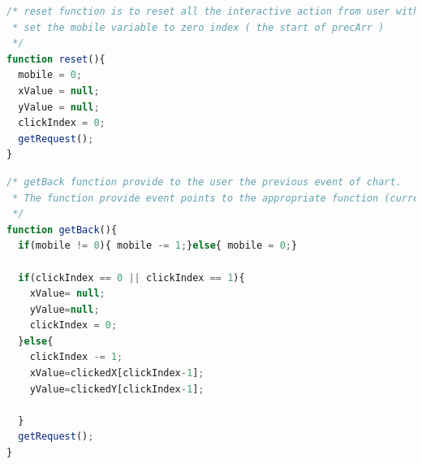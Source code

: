\documentclass[11pt]{article}
\begin{document}
\begin{lstlisting}[label={lst:reset}, language=Javascript, caption={reset function is to reset all the interactive action from user with chart, and get back to the first stage},]
/* reset function is to reset all the interactive action from user with chart.
 * set the mobile variable to zero index ( the start of precArr )
 */
function reset(){
  mobile = 0;
  xValue = null;
  yValue = null;
  clickIndex = 0;
  getRequest();
}
\end{lstlisting}

\begin{lstlisting}[label={lst:getBack}, language=Javascript, caption={getBack function provide to the user the previous stage of chart},]
/* getBack function provide to the user the previous event of chart. 
 * The function provide event points to the appropriate function (current )
 */
function getBack(){
  if(mobile != 0){ mobile -= 1;}else{ mobile = 0;}

  if(clickIndex == 0 || clickIndex == 1){
    xValue= null;
    yValue=null;
    clickIndex = 0;
  }else{
    clickIndex -= 1;
    xValue=clickedX[clickIndex-1]; 
    yValue=clickedY[clickIndex-1];
    
  }
  getRequest();
}
\end{lstlisting}
\newpage
\end{document}
